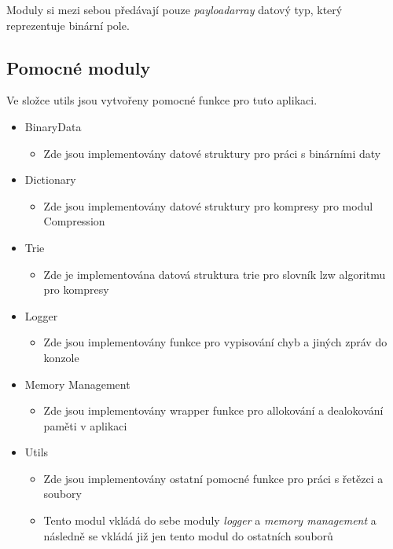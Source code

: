 \documentclass[12pt]{report}
\begin{document}
    Moduly si mezi sebou předávají pouze \textit{payloadarray} datový typ, který reprezentuje binární pole.
   
\subsection{Pomocné moduly}
    Ve složce utils jsou vytvořeny pomocné funkce pro tuto aplikaci.
    \begin{itemize}
        \item BinaryData
        \begin{itemize}
            \item Zde jsou implementovány datové struktury pro práci s binárními daty
        \end{itemize}
        \item Dictionary
        \begin{itemize}
            \item Zde jsou implementovány datové struktury pro kompresy pro modul Compression
        \end{itemize}
        \item Trie
        \begin{itemize}
            \item Zde je implementována datová struktura trie pro slovník lzw algoritmu pro kompresy
        \end{itemize}
        \item Logger
        \begin{itemize}
            \item Zde jsou implementovány funkce pro vypisování chyb a jiných zpráv do konzole
        \end{itemize}
        \item Memory Management
        \begin{itemize}
            \item Zde jsou implementovány wrapper funkce pro allokování a dealokování paměti v aplikaci
        \end{itemize}
        \item Utils
        \begin{itemize}
            \item Zde jsou implementovány ostatní pomocné funkce pro práci s řetězci a soubory
        \end{itemize}
        \begin{itemize}
            \item Tento modul vkládá do sebe moduly \textit{logger} a \textit{memory management} a následně se vkládá již jen tento modul do ostatních souborů
        \end{itemize}
    \end{itemize}
\end{document}
